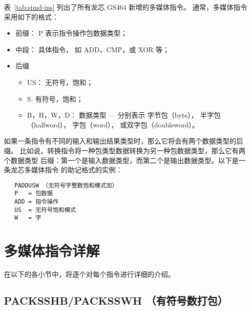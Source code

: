 表~\ref{tab:simd-ins} 列出了所有龙芯 GS464 新增的多媒体指令。
通常，多媒体指令采用如下的格式：
\begin{itemize}
  \item 前缀： P 表示指令操作包数据类型；
  \item 中段： 具体指令， 如 ADD，CMP，或 XOR 等；
  \item 后缀
    \begin{itemize}
      \item US： 无符号，饱和；
      \item S: 有符号，饱和；
      \item B，H，W，D： 数据类型 --- 分别表示 字节包（byte），
        半字包（halfword）， 字包（word）， 或双字包（doubleword）。
    \end{itemize}
\end{itemize}

如果一条指令有不同的输入和输出结果类型时，那么它将会有两个数据类型的后缀。
比如说，转换指令将一种包类型数据转换为另一种包数据类型，那么它有两个数据类型
后缀：第一个是输入数据类型，而第二个是输出数据类型。以下是一条龙芯多媒体指令
的助记格式的实例：
\begin{verbatim}
   PADDUSW （无符号字整数饱和模式加）
   P   = 包数据
   ADD = 指令操作
   US  = 无符号饱和模式
   W   = 字
\end{verbatim}

\section{多媒体指令详解}

在以下的各小节中，将逐个对每个指令进行详细的介绍。

\subsection{PACKSSHB/PACKSSWH （有符号数打包）}

